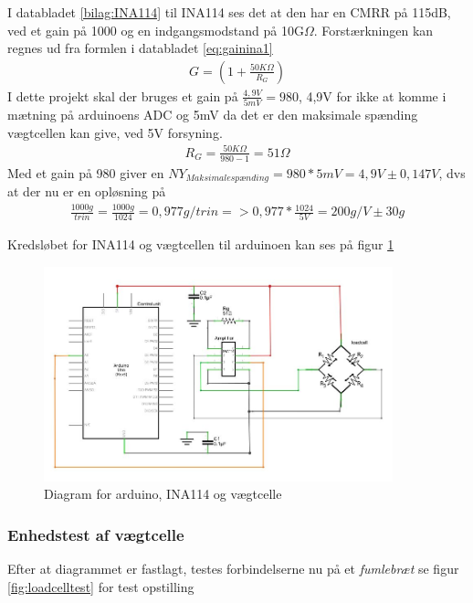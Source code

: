 I databladet \ref{bilag:INA114} til INA114 ses det at den har en CMRR på 115dB, ved et gain på 1000 og en indgangsmodstand på 10G$\Omega$. Forstærkningen kan regnes ud fra formlen i databladet \ref{eq:gainina1}
\begin{align}
 G=(1+\frac{50K\Omega}{R_{G}})
 \label{eq:gainina1}
 \end{align} 
 I dette projekt skal der bruges et gain på $\frac{4,9V}{5mV}=980$, 4,9V for ikke at komme i mætning på arduinoens ADC og 5mV da det er den maksimale spænding vægtcellen kan give, ved 5V forsyning.
 \begin{align}
 R_{G}=\frac{50K\Omega}{980-1}=51\Omega
 \label{eq:gainina2}
 \end{align}
Med et gain på 980 giver en $NY_{Maksimalespænding}=980*5mV=4,9V \pm0,147V$, dvs at der nu er en opløsning på
\begin{align}
 \frac{1000g}{trin}=\frac{1000g}{1024}=0,977g/trin=>0,977*\frac{1024}{5V}=200g/V \pm30g
 \label{eq:gainina3}
 \end{align}
 
 Kredsløbet for INA114 og vægtcellen til arduinoen kan ses på figur \ref{fig:loadcelldiagram}
 
  \begin{figure}[H]
	\centering
	\includegraphics[width=0.9\textwidth]{billeder/Hardware/diagrammer/loadcelldiagram.JPG}
	\caption{Diagram for arduino, INA114 og vægtcelle}
	\label{fig:loadcelldiagram}
\end{figure}

\subsubsection{Enhedstest af vægtcelle }

Efter at diagrammet er fastlagt, testes forbindelserne nu på et \textit{fumlebræt} se figur \ref{fig:loadcelltest} for test opstilling

